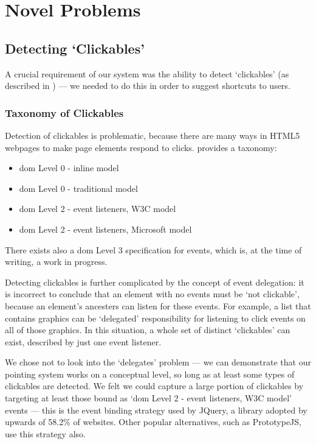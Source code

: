 \documentclass[a4paper, 12pt]{report}
\begin{document}
\section{Novel Problems}
\subsection{Detecting `Clickables'}
A crucial requirement of our system was the ability to detect `clickables' (as described in ) --- we needed to do this in order to suggest shortcuts to users.

\subsubsection{Taxonomy of Clickables}
Detection of clickables is problematic, because there are many ways in HTML5 webpages to make page elements respond to clicks. \citeauthor{events} provides a taxonomy\cite{events}:

\begin{itemize}
	\item \gls{dom} Level 0 - inline model\cite{inlineevents}
	\item \gls{dom} Level 0 - traditional model\cite{traditionalevents}
	\item \gls{dom} Level 2 - event listeners, W3C model\cite{domlevel2,advancedevents}
	\item \gls{dom} Level 2 - event listeners, Microsoft model
\end{itemize}

There exists also a \gls{dom} Level 3 specification for events\cite{domlevel3}, which is, at the time of writing, a work in progress.

Detecting clickables is further complicated by the concept of event delegation\cite{franklin2013more}: it is incorrect to conclude that an element with no events must be `not clickable', because an element's ancesters can listen for these events. For example, a list that contains graphics can be `delegated' responsibility for listening to click events on all of those graphics. In this situation, a whole set of distinct `clickables' can exist, described by just one event listener.

We chose not to look into the `delegates' problem --- we can demonstrate that our pointing system works on a conceptual level, so long as at least some types of clickables are detected. We felt we could capture a large portion of clickables by targeting at least those bound as `\gls{dom} Level 2 - event listeners, W3C model' events --- this is the event binding strategy used by JQuery, a library adopted by upwards of 58.2\% of websites\cite{jquerypopularity}. Other popular alternatives, such as PrototypeJS\cite{prototypejs}, use this strategy also.
\end{document}
